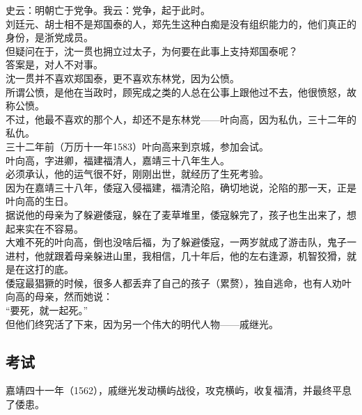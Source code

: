 \begin{multicols}{\theparacolNo}
史云：明朝亡于党争。我云：党争，起于此时。\\

刘廷元、胡士相不是郑国泰的人，郑先生这种白痴是没有组织能力的，他们真正的身份，是浙党成员。\\

但疑问在于，沈一贯也拥立过太子，为何要在此事上支持郑国泰呢？\\

答案是，对人不对事。\\

沈一贯并不喜欢郑国泰，更不喜欢东林党，因为公愤。\\

所谓公愤，是他在当政时，顾宪成之类的人总在公事上跟他过不去，他很愤怒，故称公愤。\\

不过，他最不喜欢的那个人，却还不是东林党——叶向高，因为私仇，三十二年的私仇。\\

三十二年前（万历十一年1583）叶向高来到京城，参加会试。\\

叶向高，字进卿，福建福清人，嘉靖三十八年生人。\\

必须承认，他的运气很不好，刚刚出世，就经历了生死考验。\\

因为在嘉靖三十八年，倭寇入侵福建，福清沦陷，确切地说，沦陷的那一天，正是叶向高的生日。\\

据说他的母亲为了躲避倭寇，躲在了麦草堆里，倭寇躲完了，孩子也生出来了，想起来实在不容易。\\

大难不死的叶向高，倒也没啥后福，为了躲避倭寇，一两岁就成了游击队，鬼子一进村，他就跟着母亲躲进山里，我相信，几十年后，他的左右逢源，机智狡猾，就是在这打的底。\\

倭寇最猖獗的时候，很多人都丢弃了自己的孩子（累赘），独自逃命，也有人劝叶向高的母亲，然而她说：\\

“要死，就一起死。”\\

但他们终究活了下来，因为另一个伟大的明代人物——戚继光。\\

\subsection{考试}
嘉靖四十一年（1562），戚继光发动横屿战役，攻克横屿，收复福清，并最终平息了倭患。\\


\end{multicols}
